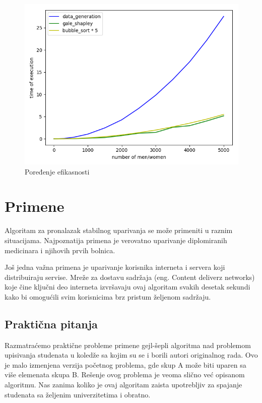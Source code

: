 \documentclass[a4paper]{article}
\begin{document}
\begin{figure}
	\centering
	\includegraphics[scale=0.5]{resources/execution_comparison.png}
	\caption{Poređenje efikasnosti}
	\label{fig1}
\end{figure}
\section{Primene}

Algoritam za pronalazak stabilnog uparivanja se može primeniti u raznim situacijama. Najpoznatija primena je verovatno uparivanje diplomiranih medicinara i njihovih prvih bolnica. 

Još jedna važna primena je uparivanje korisnika interneta i servera koji distribuiraju servise. Mreže za dostavu sadržaja (eng. Content deliverz networks) koje čine ključni deo interneta izvršavaju ovaj algoritam svakih desetak sekundi kako bi omogućili svim korisnicima brz pristum željenom sadržaju.

\subsection{Praktična pitanja}
Razmatraćemo praktične probleme primene gejl-šepli algoritma nad problemom upisivanja studenata u koledže sa kojim su se i borili autori originalnog rada. Ovo je malo izmenjena verzija početnog problema, gde skup A može biti uparen sa više elemenata skupa B. Rešenje ovog problema je veoma slično već opisanom algoritmu. Nas zanima koliko je ovaj algoritam zaista upotrebljiv za spajanje studenata sa željenim univerzitetima i obratno.
\end{document}
